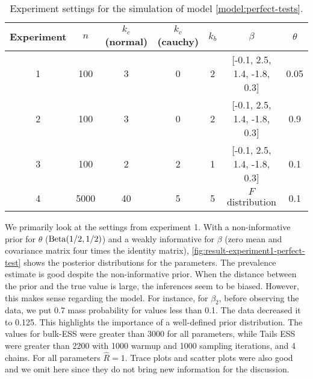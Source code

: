 \begin{table}[!ht]
  \centering
  \caption{\label{table:experiments-perfect-test}Experiment settings for the
    simulation of model \eqref{model:perfect-tests}.}
  \begin{tabular}{ccccccc}
    \hline
    Experiment            & $n$  & $k_{c}$ (normal) & $k_{c}$ (cauchy) & $k_{b}$ & $\beta$                         & $\theta$ \\ \hline
    \multicolumn{1}{c}{1} & 100  & 3                & 0                & 2       & {[}-0.1, 2.5, 1.4, -1.8, 0.3{]} & 0.05     \\
    \multicolumn{1}{c}{2} & 100  & 3                & 0                & 2       & {[}-0.1, 2.5, 1.4, -1.8, 0.3{]} & 0.9      \\
    \multicolumn{1}{c}{3} & 100  & 2                & 2                & 1       & {[}-0.1, 2.5, 1.4, -1.8, 0.3{]} & 0.1      \\
    \multicolumn{1}{c}{4} & 5000 & 40               & 5                & 5       & $F$ distribution                & 0.1      \\\hline
  \end{tabular}
\end{table}

We primarily look at the settings from experiment 1. With a non-informative prior for $\theta$
($\operatorname{Beta}(1/2, 1/2)$) and a weakly informative for $\beta$
(zero mean and covariance matrix four times the identity matrix),
\autoref{fig:result-experiment1-perfect-test} shows the posterior
distributions for the parameters. The prevalence estimate is good despite
the non-informative prior. When the distance between the prior and the true value is large, the
inferences seem to be biased. However, this makes sense regarding the model. For
instance, for $\beta_2$, before observing the data, we put 0.7 mass probability
for values less than 0.1. The data decreased it to 0.125. This highlights
the importance of a well-defined prior distribution. The values for bulk-ESS
were greater than 3000 for all parameters, while Tails ESS were greater than
2200 with 1000 warmup and 1000 sampling iterations, and 4 chains. For all
parameters $\hat{R} = 1$. Trace plots and scatter plots were also good and we
omit here since they do not bring new information for the discussion.

